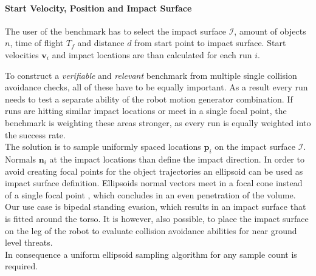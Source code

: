 \paragraph{Start Velocity, Position and Impact Surface} \label{par:benchmark:setup:velPosImpact}
The user of the benchmark has to select the impact surface $\mathcal I$, amount of objects $n$, time of flight $T_f$ and distance $d$ from start point to impact surface.
Start velocities $\bm v_i$ and impact locations are than calculated for each run $i$.
\par
To construct a \textit{verifiable} and \textit{relevant} benchmark from multiple single collision avoidance checks, all of these have to be equally important.
As a result every run needs to test a separate ability of the robot motion generator combination.
If runs are hitting similar impact locations or meet in a single focal point, the benchmark is weighting these areas stronger, as every run is equally weighted into the success rate.
\\
The solution is to sample uniformly spaced locations $\bm p_i$ on the impact surface $\mathcal I$.
Normals $\bm n_i$ at the impact locations than define the impact direction.
In order to avoid creating focal points for the object trajectories an ellipsoid can be used as impact surface definition.
Ellipsoids normal vectors meet in a focal cone instead of a single focal point \cite{staude_1886}, which concludes in an even penetration of the volume.
\\
Our use case is bipedal standing evasion, which results in an impact surface that is fitted around the torso.
It is however, also possible, to place the impact surface on the leg of the robot to evaluate collision avoidance abilities for near ground level threats.
\\
In consequence a uniform ellipsoid sampling algorithm for any sample count is required.

